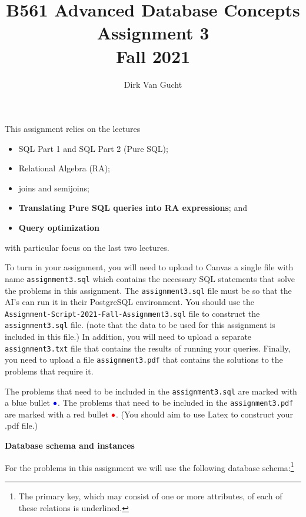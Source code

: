 \documentclass[11pt]{article}
\newcommand{\red}[1]{{\color{red}#1}}
\newcommand{\blue}[1]{{\color{blue}#1}}
\newcommand{\redbullet}{$\red{\bullet}$}
\newcommand{\bluebullet}{$\blue{\bullet}$}
\begin{document}
\title{B561 Advanced Database Concepts \\Assignment 3 \\Fall 2021}
\author{Dirk Van Gucht}
\date{}
\maketitle

This {assignment} relies on the lectures
\begin{itemize}
\item SQL Part 1 and SQL Part 2 (Pure SQL);
\item Relational Algebra (RA);
\item joins and semijoins;
\item \blue{\bf Translating Pure SQL queries into RA expressions}; and
\item \blue{\bf Query optimization}
\end{itemize}
with particular focus on the last two lectures.

To turn in your assignment, you will need to upload to Canvas a single file with name {\tt assignment3.sql} which contains 
the necessary SQL statements that solve the problems in this assignment.   
The {\tt assignment3.sql} file must be so that the AI's can run it in their PostgreSQL environment.  
You should use the {\tt Assignment-Script-2021-Fall-Assignment3.sql} file to construct the {\tt assignment3.sql} file. 
(note that the data to be used for this assignment is included in this file.)
In addition, you will need to upload a separate {\tt assignment3.txt} file that contains the results of running
your queries.
Finally, you need to upload a file {\tt assignment3.pdf} that contains the solutions to the problems that require it.

The problems that need to be included in the {\tt assignment3.sql} are marked with a blue bullet \bluebullet.
The problems that need to be included in the {\tt assignment3.pdf} are marked with a red bullet \redbullet.
(You should aim to use Latex to construct your .pdf file.)

\newpage
\noindent
\large{\bf Database schema and instances}
\bigskip




For the problems in this assignment we will use the following database schema:\footnote{The primary key, which may consist of one or more attributes, of each of these relations is underlined.}
\end{document}
